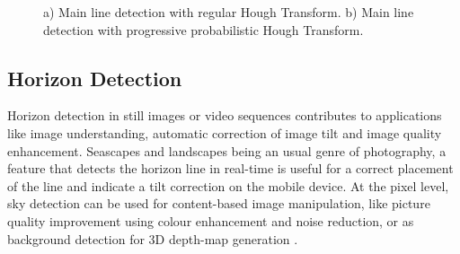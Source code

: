 \begin{figure}[htbp]
	\centering
  	\caption{a) Main line detection with regular Hough Transform. b) Main line detection with progressive probabilistic Hough Transform.}
    \label{fig:hough_methods}
\end{figure}

\subsection{Horizon Detection}
\label{sub:horizon_detection}

Horizon detection in still images or video sequences contributes to applications like image understanding, automatic correction of image tilt and image quality enhancement. Seascapes and landscapes being an usual genre of photography, a feature that detects the horizon line in real-time is useful for a correct placement of the line and indicate a tilt correction on the mobile device. At the pixel level, sky detection can be used for content-based image manipulation, like picture quality improvement using colour enhancement and noise reduction, or as background detection for 3D depth-map generation \cite{zafarifar2006blue}.

